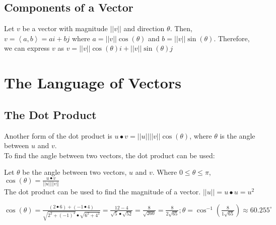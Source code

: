 \documentclass{report}
\begin{document}
\section{Components of a Vector}

Let $v$ be a vector with magnitude $||v||$ and direction $\theta$. Then, $v=\left\langle a,b \right\rangle=ai+bj$ where $a=||v||\cos(\theta)$ and $b=||v||\sin(\theta)$. Therefore, we can express $v$ as $v=||v||\cos(\theta)i+||v||\sin(\theta)j$

\chapter{The Language of Vectors}

\section{The Dot Product}


Another form of the dot product is $u \bullet v=||u||||v||\cos(\theta)$, where $\theta$ is the angle between $u$ and $v$.\\

To find the angle between two vectors, the dot product can be used:

Let $\theta$ be the angle between two vectors, $u$ and $v$. Where $0\le\theta\le\pi$, $\cos(\theta)=\frac{u \bullet v}{||u||||v||}$\\

The dot product can be used to find the magnitude of a vector. $||u||=u \bullet u=u^2$



\sol $\cos(\theta)=\frac{(2 \bullet 6)+(-1 \bullet 4)}{\sqrt{2^2+(-1)^2}\bullet\sqrt{6^2+4^2}}=\frac{12-4}{\sqrt{5}\bullet\sqrt{52}}=\frac{8}{\sqrt{260}}=\frac{8}{2\sqrt{65}};\theta=\cos^{-1}(\frac{8}{1\sqrt{65}})\approx \boxed{60.255^\circ}$
\end{document}
